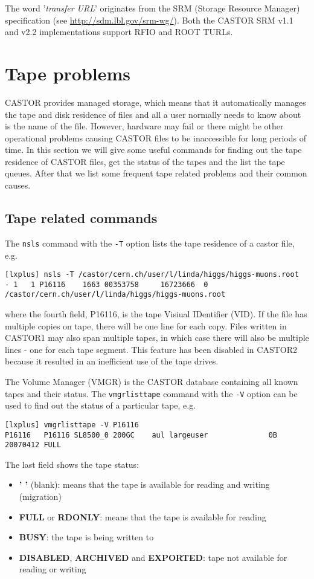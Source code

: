 The word '{\em transfer URL}' originates from the SRM (Storage Resource Manager) specification
(see \url{http://sdm.lbl.gov/srm-wg/}). Both the CASTOR SRM v1.1 and v2.2 implementations
support RFIO and ROOT TURLs.

\section{Tape problems}
\label{sect:tapepbs}
CASTOR provides managed storage, which means that it automatically manages the tape and disk
residence of files and all a user normally needs to know about is the name of the file. However,
hardware may fail or there might be other operational problems causing CASTOR files to be
inaccessible for long periods of time. In this section we will give some useful commands for
finding out the tape residence of CASTOR files, get the status of the tapes and the list the tape
queues. After that we list some frequent tape related problems and their common causes.

\subsection{Tape related commands}
The {\tt nsls} command with the {\tt -T} option lists the tape residence of a castor file, e.g.
\small
\begin{verbatim}
[lxplus] nsls -T /castor/cern.ch/user/l/linda/higgs/higgs-muons.root
- 1   1 P16116    1663 00353758     16723666  0 /castor/cern.ch/user/l/linda/higgs/higgs-muons.root
\end{verbatim}
\normalsize
where the fourth field, P16116, is the tape Visiual IDentifier (VID). If the file has multiple
copies on tape, there will be one line for each copy. Files written in CASTOR1 may also span
multiple tapes, in which case there will also be multiple lines - one for each tape segment. This
feature has been disabled in CASTOR2 because it resulted in an inefficient use of the tape drives.

The Volume Manager (VMGR) is the CASTOR database containing all known tapes and their
status. The {\tt vmgrlisttape} command with the {\tt -V} option can be used to find out the
status of a particular tape, e.g.
\small
\begin{verbatim}
[lxplus] vmgrlisttape -V P16116
P16116   P16116 SL8500_0 200GC    aul largeuser              0B 20070412 FULL
\end{verbatim}
\normalsize
The last field shows the tape status:
\begin{itemize}
\item {\bf ' '} (blank): means that the tape is available for reading and writing (migration)
\item {\bf FULL} or {\bf RDONLY}: means that the tape is available for reading
\item {\bf BUSY}: the tape is being written to
\item {\bf DISABLED}, {\bf ARCHIVED} and {\bf EXPORTED}: tape not available for reading or writing
\end{itemize}

